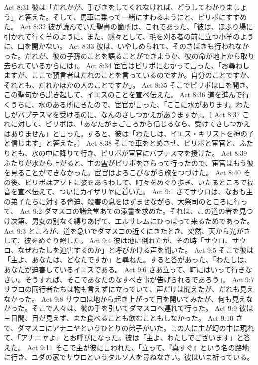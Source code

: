 Act 8:31  彼は「だれかが、手びきをしてくれなければ、どうしてわかりましょう」と答えた。そして、馬車に乗って一緒にすわるようにと、ピリポにすすめた。
Act 8:32  彼が読んでいた聖書の箇所は、これであった、「彼は、ほふり場に引かれて行く羊のように、また、黙々として、毛を刈る者の前に立つ小羊のように、口を開かない。
Act 8:33  彼は、いやしめられて、そのさばきも行われなかった。だれが、彼の子孫のことを語ることができようか、彼の命が地上から取り去られているからには」。
Act 8:34  宦官はピリポにむかって言った、「お尋ねしますが、ここで預言者はだれのことを言っているのですか。自分のことですか、それとも、だれかほかの人のことですか」。
Act 8:35  そこでピリポは口を開き、この聖句から説き起して、イエスのことを宣べ伝えた。
Act 8:36  道を進んで行くうちに、水のある所にきたので、宦官が言った、「ここに水があります。わたしがバプテスマを受けるのに、なんのさしつかえがありますか」。〔
Act 8:37  これに対して、ピリポは、「あなたがまごころから信じるなら、受けてさしつかえはありません」と言った。すると、彼は「わたしは、イエス・キリストを神の子と信じます」と答えた。〕
Act 8:38  そこで車をとめさせ、ピリポと宦官と、ふたりとも、水の中に降りて行き、ピリポが宦官にバプテスマを授けた。
Act 8:39  ふたりが水から上がると、主の霊がピリポをさらって行ったので、宦官はもう彼を見ることができなかった。宦官はよろこびながら旅をつづけた。
Act 8:40  その後、ピリポはアゾトに姿をあらわして、町々をめぐり歩き、いたるところで福音を宣べ伝えて、ついにカイザリヤに着いた。
Act 9:1  さてサウロは、なおも主の弟子たちに対する脅迫、殺害の息をはずませながら、大祭司のところに行って、
Act 9:2  ダマスコの諸会堂あての添書を求めた。それは、この道の者を見つけ次第、男女の別なく縛りあげて、エルサレムにひっぱって来るためであった。
Act 9:3  ところが、道を急いでダマスコの近くにきたとき、突然、天から光がさして、彼をめぐり照した。
Act 9:4  彼は地に倒れたが、その時「サウロ、サウロ、なぜわたしを迫害するのか」と呼びかける声を聞いた。
Act 9:5  そこで彼は「主よ、あなたは、どなたですか」と尋ねた。すると答があった、「わたしは、あなたが迫害しているイエスである。
Act 9:6  さあ立って、町にはいって行きなさい。そうすれば、そこであなたのなすべき事が告げられるであろう」。
Act 9:7  サウロの同行者たちは物も言えずに立っていて、声だけは聞えたが、だれも見えなかった。
Act 9:8  サウロは地から起き上がって目を開いてみたが、何も見えなかった。そこで人々は、彼の手を引いてダマスコへ連れて行った。
Act 9:9  彼は三日間、目が見えず、また食べることも飲むこともしなかった。
Act 9:10  さて、ダマスコにアナニヤというひとりの弟子がいた。この人に主が幻の中に現れて、「アナニヤよ」とお呼びになった。彼は「主よ、わたしでございます」と答えた。
Act 9:11  そこで主が彼に言われた、「立って、『真すぐ』という名の路地に行き、ユダの家でサウロというタルソ人を尋ねなさい。彼はいま祈っている。
